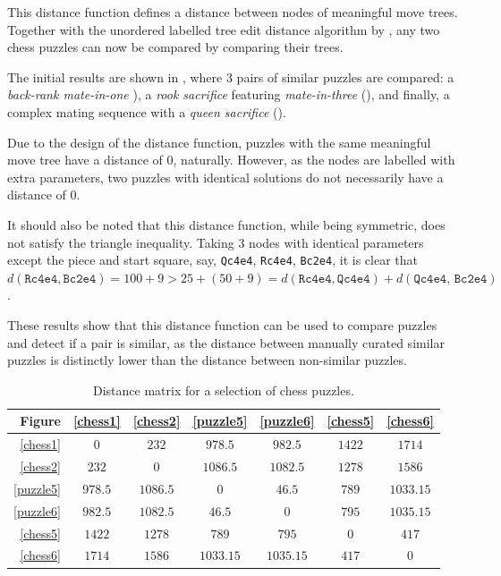 This distance function defines a distance between nodes of meaningful move
trees. Together with the unordered labelled tree edit distance algorithm by
\citet{editDistTrees}, any two chess puzzles can now be compared by comparing
their trees.

The initial results are shown in , where 3 pairs of
similar puzzles are compared: a \emph{back-rank mate-in-one}
), a \emph{rook sacrifice} featuring \emph{mate-in-three}
(), and finally, a complex mating sequence with a
\emph{queen sacrifice} (). 

Due to the design of the distance function, puzzles with the same meaningful
move tree have a distance of 0, naturally. However, as the nodes are labelled
with extra parameters, two puzzles with identical solutions do not necessarily
have a distance of 0.

It should also be noted that this distance function, while being symmetric,
does not satisfy the triangle inequality. Taking 3 nodes with identical
parameters except the piece and start square, say, \texttt{Qc4e4},
\texttt{Rc4e4}, \texttt{Bc2e4}, it is clear that $d(\texttt{Rc4e4},
\texttt{Bc2e4}) = 100 + 9 > 25 + (50 + 9) = d(\texttt{Rc4e4}, \texttt{Qc4e4}) +
d(\texttt{Qc4e4, Bc2e4})$.

These results show that this distance function can be used to compare puzzles
and detect if a pair is similar, as the distance between manually curated
similar puzzles is distinctly lower than the distance between non-similar
puzzles.

\begin{table}[H]
  \centering
  \begin{tabular}{r|cccccc}
    Figure &
    \ref{chess1}&\ref{chess2}&\ref{puzzle5}&\ref{puzzle6}&\ref{chess5}&\ref{chess6}
    \\
    \hline
    \ref{chess1} & $0$ & $232$ & $978.5$ & $982.5$ & $1422$ & $1714$ \\ 
    \ref{chess2} & $232$ & $0$ & $1086.5$ & $1082.5$ & $1278$ & $1586$ \\
    \ref{puzzle5} & $978.5$ & $1086.5$ & $0$ & $46.5$ & $789$ & $1033.15$ \\
    \ref{puzzle6} & $982.5$ & $1082.5$ & $46.5$ & $0$ & $795$ & $1035.15$ \\
    \ref{chess5} & $1422$ & $1278$ & $789$ & $795$ & $0$ & $417$ \\
    \ref{chess6} & $1714$ & $1586$ & $1033.15$ & $1035.15$ & $417$ & $0$ \\
  \end{tabular}
  \caption{Distance matrix for a selection of chess puzzles.}
  \label{distanceComparisons}
\end{table}

